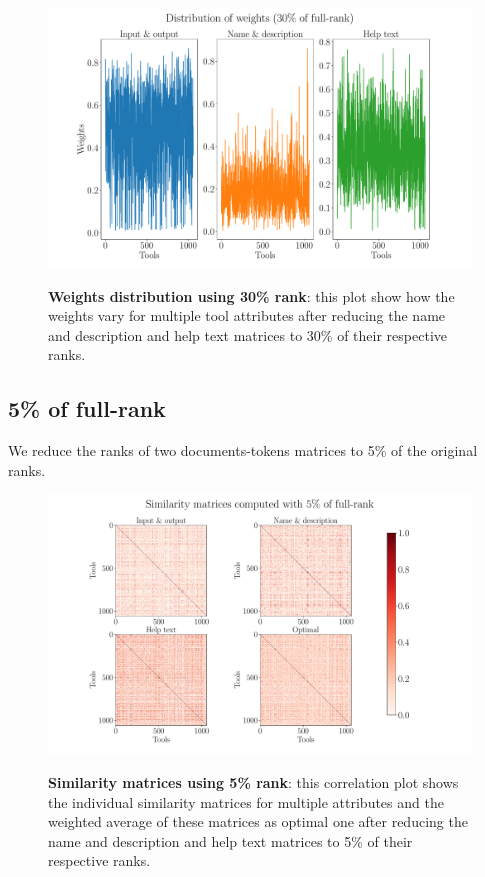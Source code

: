 \begin{figure}[h]
\begin{centering}
    {\includegraphics[scale=0.35]{figures/Weights_030.pdf}}
    \caption[Weights distribution 30\% rank]{\textbf{Weights distribution using 30\% rank}: this plot show how the weights vary for multiple tool attributes after reducing the name and description and help text matrices to 30\% of their respective ranks.}
\end{centering}
\end{figure}

\subsection{5\% of full-rank}
We reduce the ranks of two documents-tokens matrices to 5\% of the original ranks.

\begin{figure}[h]
\begin{centering}
    {\includegraphics[scale=0.35]{figures/Similarity_matrices_005.pdf}}
    \caption[Similarity matrices 5\% rank]{\textbf{Similarity matrices using 5\% rank}: this correlation plot shows the individual similarity matrices for multiple attributes and the weighted average of these matrices as optimal one after reducing the name and description and help text matrices to 5\% of their respective ranks.}
\end{centering}
\end{figure}

